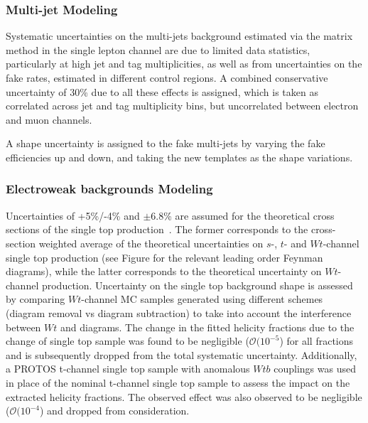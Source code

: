 
\subsubsection{Multi-jet Modeling}
\label{sec:qcd_norm}
Systematic uncertainties on the multi-jets background estimated via the matrix method
in the single lepton channel are due to limited data statistics, particularly at high jet and \bt tag
multiplicities, as well as from uncertainties on the fake rates, estimated in
different control regions. A combined conservative uncertainty of 30\% due
to all these effects is assigned, which is taken as correlated across jet
and \bt tag multiplicity bins, but uncorrelated between electron and muon channels.

A shape uncertainty is assigned to the fake multi-jets
by varying the fake efficiencies up and down, and taking the new templates as
the shape variations.

\subsubsection{Electroweak backgrounds Modeling}
\label{sec:ew_norm}
Uncertainties of +5\%/-4\% and $\pm 6.8$\% are
assumed for the theoretical cross sections of the single
top production~\cite{stopxs,stopxs_2}.
The former corresponds to the cross-section weighted average
of the theoretical uncertainties on $s$-, $t$- and $Wt$-channel single top production (see Figure\cite{fig:singleTopProduction} for the relevant leading order Feynman diagrams), while the latter corresponds to the theoretical uncertainty on $Wt$-channel production.
Uncertainty on the single top background shape is assessed by comparing
$Wt$-channel MC samples generated using different schemes (diagram removal vs diagram subtraction) to take into account the interference between
$Wt$ and \ttbar diagrams. The change in the fitted helicity fractions due to the change of single top sample 
was found to be negligible ($\mathcal{O}(10^{-5}$) for all fractions and is subsequently dropped from  
the total systematic uncertainty. Additionally, a PROTOS t-channel single top sample with anomalous $Wtb$ couplings was used in place of the nominal t-channel single top sample to assess the impact on the extracted helicity fractions. The observed effect was also observed to be negligible ($\mathcal{O}(10^{-4}$) and dropped from consideration.

